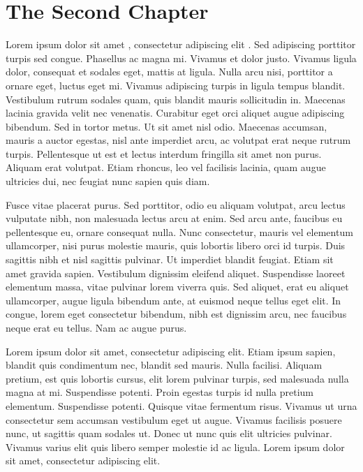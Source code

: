 \chapter{The Second Chapter}

Lorem ipsum dolor sit amet \cite{abramowitz+stegun}, consectetur adipiscing elit . Sed adipiscing porttitor turpis sed congue. Phasellus ac magna mi. Vivamus et dolor justo. Vivamus ligula dolor, consequat et sodales eget, mattis at ligula. Nulla arcu nisi, porttitor a ornare eget, luctus eget mi. Vivamus adipiscing turpis in ligula tempus blandit. Vestibulum rutrum sodales quam, quis blandit mauris sollicitudin in. Maecenas lacinia gravida velit nec venenatis. Curabitur eget orci aliquet augue adipiscing bibendum. Sed in tortor metus. Ut sit amet nisl odio. Maecenas accumsan, mauris a auctor egestas, nisl ante imperdiet arcu, ac volutpat erat neque rutrum turpis. Pellentesque ut est et lectus interdum fringilla sit amet non purus. Aliquam erat volutpat. Etiam rhoncus, leo vel facilisis lacinia, quam augue ultricies dui, nec feugiat nunc sapien quis diam.

Fusce vitae placerat purus. Sed porttitor, odio eu aliquam volutpat, arcu lectus vulputate nibh, non malesuada lectus arcu at enim. Sed arcu ante, faucibus eu pellentesque eu, ornare consequat nulla. Nunc consectetur, mauris vel elementum ullamcorper, nisi purus molestie mauris, quis lobortis libero orci id turpis. Duis sagittis nibh et nisl sagittis pulvinar. Ut imperdiet blandit feugiat. Etiam sit amet gravida sapien. Vestibulum dignissim eleifend aliquet. Suspendisse laoreet elementum massa, vitae pulvinar lorem viverra quis. Sed aliquet, erat eu aliquet ullamcorper, augue ligula bibendum ante, at euismod neque tellus eget elit. In congue, lorem eget consectetur bibendum, nibh est dignissim arcu, nec faucibus neque erat eu tellus. Nam ac augue purus.

Lorem ipsum dolor sit amet, consectetur adipiscing elit. Etiam ipsum sapien, blandit quis condimentum nec, blandit sed mauris. Nulla facilisi. Aliquam pretium, est quis lobortis cursus, elit lorem pulvinar turpis, sed malesuada nulla magna at mi. Suspendisse potenti. Proin egestas turpis id nulla pretium elementum. Suspendisse potenti. Quisque vitae fermentum risus. Vivamus ut urna consectetur sem accumsan vestibulum eget ut augue. Vivamus facilisis posuere nunc, ut sagittis quam sodales ut. Donec ut nunc quis elit ultricies pulvinar. Vivamus varius elit quis libero semper molestie id ac ligula. Lorem ipsum dolor sit amet, consectetur adipiscing elit.


